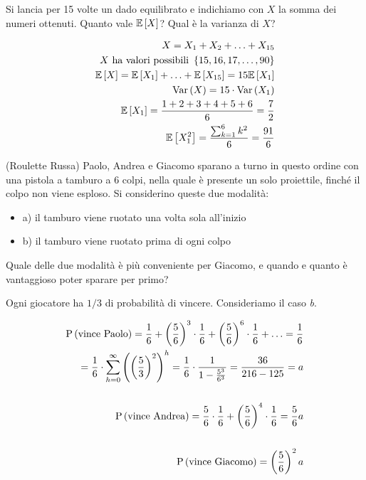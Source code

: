\begin{exrc}
    Si lancia per 15 volte un dado equilibrato e indichiamo con $ X $ la somma dei numeri ottenuti. Quanto vale \(\mathbb{E}\left[X\right]\)? Qual \`e la varianza di \(X\)?

    \begin{equation*}
    \begin{aligned}
        X = X_1 + X_2 + \hdots + X_{15} \\
        X \text{ ha valori possibili } \left\{ 15, 16, 17, \hdots, 90\right\} \\
        \mathbb{E}\left[X\right] = \mathbb{E}\left[X_1\right] + \hdots + \mathbb{E}\left[X_{15}\right] = 15 \mathbb{E}\left[X_1\right] \\
        \text{Var}\left(X\right) = 15 \cdot \text{Var}\left(X_1\right) \\
        \mathbb{E}\left[X_1\right] = \dfrac{1 + 2 + 3 + 4 + 5 + 6}{6} = \dfrac{7}{2} \\
        \mathbb{E}\left[X_1^2\right] = \dfrac{\sum_{k=1}^6 k^2}{6} = \dfrac{91}{6}
    \end{aligned}
    \end{equation*}
\end{exrc}

\begin{exrc} (Roulette Russa)
    Paolo, Andrea e Giacomo sparano a turno in questo ordine con una pistola a tamburo a 6 colpi, nella quale \`e presente un solo proiettile, finch\'e il colpo non viene esploso. Si considerino queste due modalit\`a:
    \begin{itemize}
        \item a) il tamburo viene ruotato una volta sola all'inizio
        \item b) il tamburo viene ruotato prima di ogni colpo
    \end{itemize}

    Quale delle due modalit\`a \`e pi\`u conveniente per Giacomo, e quando e quanto \`e vantaggioso poter sparare per primo?

    Ogni giocatore ha \(1/3\) di probabilit\`a di vincere. Consideriamo il caso \textit{b}.

    \begin{equation*}
        \begin{aligned}
            \text{P}\left(\text{vince Paolo}\right) = \frac{1}{6} + \left( \frac{5}{6} \right)^3 \cdot \frac{1}{6} + \left( \frac{5}{6} \right)^6 \cdot \frac{1}{6} + \hdots = \frac{1}{6} \\
            = \frac{1}{6} \cdot \sum_{h=0}^\infty \left( \left( \frac{5}{3} \right)^2 \right)^h = \frac{1}{6} \cdot \frac{1}{1- \frac{5^3}{6^3} } = \frac{36}{216 - 125} = a \\ \\
            \text{P}\left(\text{vince Andrea}\right) = \frac{5}{6} \cdot \frac{1}{6} + \left( \frac{5}{6} \right)^4 \cdot \frac{1}{6} = \frac{5}{6}a \\ \\
            \text{P}\left(\text{vince Giacomo}\right) = \left( \frac{5}{6} \right)^2 a
        \end{aligned}
    \end{equation*}

\end{exrc}


